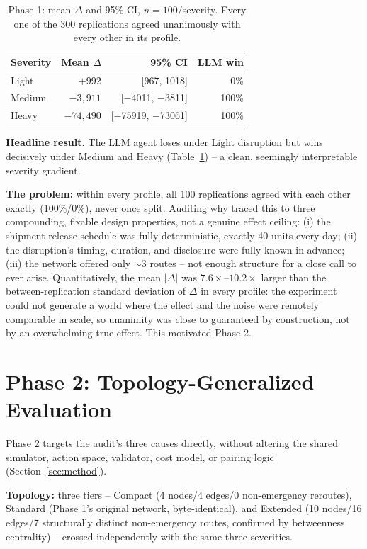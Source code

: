 \documentclass[10pt,twocolumn]{article}
\begin{document}
\begin{table}[t]
\centering
\small
\begin{tabular}{@{}lrrr@{}}
\toprule
Severity & Mean $\Delta$ & 95\% CI & LLM win \\
\midrule
Light  & $+992$ & [967, 1018] & 0\% \\
Medium & $-3{,}911$ & [$-$4011, $-$3811] & 100\% \\
Heavy  & $-74{,}490$ & [$-$75919, $-$73061] & 100\% \\
\bottomrule
\end{tabular}
\caption{Phase 1: mean $\Delta$ and 95\% CI, $n=100$/severity. Every one of the 300 replications agreed unanimously with every other in its profile.}
\label{tab:v1}
\end{table}

\textbf{Headline result.} The LLM agent loses under Light disruption but wins decisively under Medium and Heavy (Table~\ref{tab:v1}) -- a clean, seemingly interpretable severity gradient.

\textbf{The problem:} within every profile, all 100 replications agreed with each other exactly (100\%/0\%), never once split. Auditing why traced this to three compounding, fixable design properties, not a genuine effect ceiling: (i) the shipment release schedule was fully deterministic, exactly 40 units every day; (ii) the disruption's timing, duration, and disclosure were fully known in advance; (iii) the network offered only $\sim$3 routes -- not enough structure for a close call to ever arise. Quantitatively, the mean $|\Delta|$ was $7.6\times$--$10.2\times$ larger than the between-replication standard deviation of $\Delta$ in every profile: the experiment could not generate a world where the effect and the noise were remotely comparable in scale, so unanimity was close to guaranteed by construction, not by an overwhelming true effect. This motivated Phase 2.

\section{Phase 2: Topology-Generalized Evaluation}
\label{sec:phase2}
Phase 2 targets the audit's three causes directly, without altering the shared simulator, action space, validator, cost model, or pairing logic (Section~\ref{sec:method}).

\textbf{Topology:} three tiers -- Compact (4 nodes/4 edges/0 non-emergency reroutes), Standard (Phase 1's original network, byte-identical), and Extended (10 nodes/16 edges/7 structurally distinct non-emergency routes, confirmed by betweenness centrality) -- crossed independently with the same three severities.
\end{document}
